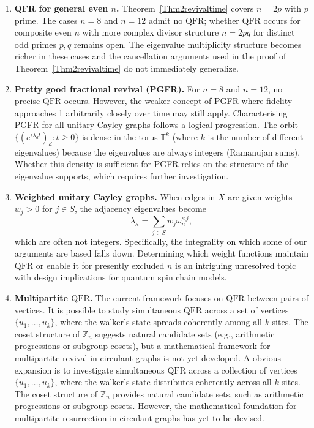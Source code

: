 \documentclass[12pt]{amsart}
\newcommand{\QFR}{\mathrm{QFR}}
\begin{document}
\begin{enumerate}
  \item \textbf{QFR for general even $n$.} Theorem~\ref{Thm2revivaltime} covers $n=2p$
  with $p$ prime. The cases $n = 8$ and $n = 12$ admit no $\QFR$; whether $\QFR$ occurs for
  composite even $n$ with more complex divisor structure $n=2pq$ for distinct odd primes $p, q$ remains open. The eigenvalue multiplicity structure becomes richer in
  these cases and the cancellation arguments used in the proof of Theorem~\ref{Thm2revivaltime}
  do not immediately generalize.

  \item \textbf{Pretty good fractional revival (PGFR).} For $n=8$ and $n=12$, no precise $\QFR$ occurs. However, the weaker concept of PGFR where fidelity approaches 1 arbitrarily closely over time may still apply. Characterising PGFR for all unitary Cayley graphs follows a logical progression. The orbit $\{(e^{i\lambda_d t})_d: t \geq 0\}$ is dense in the torus $\mathbb{T}^k$ (where $k$ is the number of different eigenvalues) because the eigenvalues are always integers (Ramanujan sums). Whether this density is sufficient for PGFR relies on the structure of the eigenvalue supports, which requires further investigation.

  \item \textbf{Weighted unitary Cayley graphs.} When edges in $X$ are given weights $w_j > 0$ for $j \in S$, the adjacency eigenvalues become $$\lambda_{\kappa}=\sum_{j \in S} w_j \omega_n^{\kappa\,j},$$ which are often not integers.
  Specifically, the integrality on which some of our arguments are based falls down. Determining which weight functions maintain $\QFR$ or enable it for presently excluded $n$ is an intriguing unresolved topic with design implications for quantum spin chain models.

  \item \textbf{Multipartite $\QFR$.} The current framework focuses on $\QFR$ between pairs of vertices. It is possible to study simultaneous $\QFR$ across a set of vertices $\{u_1, \ldots, u_k\}$, where the walker's state spreads coherently among all $k$ sites. The coset structure of $\mathbb{Z}_n$ suggests natural candidate sets (e.g., arithmetic progressions or subgroup cosets), but a mathematical framework for multipartite revival in circulant graphs is not yet developed. A obvious expansion is to investigate simultaneous $\QFR$ across a collection of vertices $\{u_1, \ldots, u_k\}$, where the walker's state distributes coherently across all $k$ sites.
  The coset structure of $\mathbb{Z}_n$ provides natural candidate sets, such as arithmetic progressions or subgroup cosets. However, the mathematical foundation for multipartite resurrection in circulant graphs has yet to be devised.


\end{enumerate}
\end{document}
